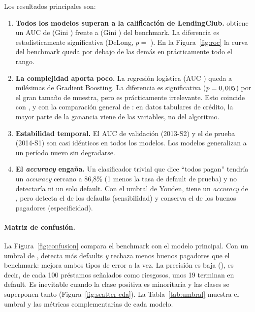 \documentclass{article}
\begin{document}
Los resultados principales son:
\begin{enumerate}
  \item \textbf{Todos los modelos superan a la calificación de LendingClub.}
        \mejorModelo{} obtiene un AUC de \aucMejor{} (Gini \giniMejor) frente a
        \aucBench{} (Gini \giniBench) del benchmark. La diferencia es
        estadísticamente significativa (DeLong, $p=$ \pDelongBench). En la
        Figura~\ref{fig:roc} la curva del benchmark queda por debajo de las demás
        en prácticamente todo el rango.
  \item \textbf{La complejidad aporta poco.} La regresión logística
        (AUC \aucLogit) queda a milésimas de Gradient Boosting. La diferencia es
        significativa ($p=0,005$) por el gran tamaño de muestra, pero es
        prácticamente irrelevante. Esto coincide con \citet{namvar2018},
        \citet{turiel2020} y con la comparación general de \citet{lessmann2015}:
        en datos tabulares de crédito, la mayor parte de la ganancia viene de las
        variables, no del algoritmo.
  \item \textbf{Estabilidad temporal.} El AUC de validación (2013-S2) y el de
        prueba (2014-S1) son casi idénticos en todos los modelos. Los modelos
        generalizan a un período nuevo sin degradarse.
  \item \textbf{El \emph{accuracy} engaña.} Un clasificador trivial que dice
        ``todos pagan'' tendría un \emph{accuracy} cercano a 86,8\% (1 menos la
        tasa de default de prueba) y no detectaría ni un solo default. Con el
        umbral de Youden, \mejorModelo{} tiene un \emph{accuracy} de \accMejor,
        pero detecta el \sensMejor{} de los defaults (sensibilidad) y conserva el
        \especMejor{} de los buenos pagadores (especificidad).
\end{enumerate}

\paragraph{Matriz de confusión.} La Figura~\ref{fig:confusion} compara el
benchmark con el modelo principal. Con un umbral de \umbralMejor{}, \mejorModelo{}
detecta más defaults \emph{y} rechaza menos buenos pagadores que el benchmark:
mejora ambos tipos de error a la vez. La precisión es baja (\precMejor), es decir,
de cada 100 préstamos señalados como riesgosos, unos 19 terminan en default. Es
inevitable cuando la clase positiva es minoritaria y las clases se superponen
tanto (Figura~\ref{fig:scatter-eda}). La Tabla~\ref{tab:umbral} muestra el umbral
y las métricas complementarias de cada modelo.
\end{document}
